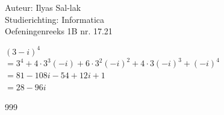 \documentclass[a4paper]{article}
\begin{document}
\noindent \large Auteur: Ilyas Sal-lak \\
\noindent \large Studierichting: Informatica\\
\noindent \large Oefeningenreeks 1B nr. 17.21\\

\medskip

\normalsize



$\left(3 - i\right)^4$ \\

$=3^4 + 4 \cdot 3^3 (-i) + 6 \cdot 3^2 (-i)^2 + 4 \cdot 3(-i)^3 + (-i)^4$ \\

$= 81 -108i -54 + 12i + 1$ \\

$= 28 - 96i$ \\

\begin{thebibliography}{999}
\end{thebibliography}
\end{document}
